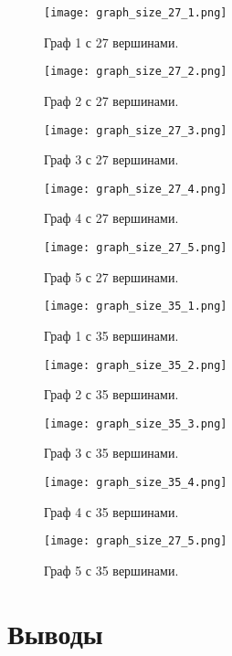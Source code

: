 \documentclass[12pt, a4paper]{report}
\begin{document}
	\begin{figure}[h]
		\centering
		\texttt{[image: graph\_size\_27\_1.png]}
		\caption{Граф 1 с 27 вершинами.}
	\end{figure}
	\begin{figure}[h]
		\centering
		\texttt{[image: graph\_size\_27\_2.png]}
		\caption{Граф 2 с 27 вершинами.}
	\end{figure}
	\begin{figure}[h]
		\centering
		\texttt{[image: graph\_size\_27\_3.png]}
		\caption{Граф 3 с 27 вершинами.}
	\end{figure}
	\begin{figure}[h]
		\centering
		\texttt{[image: graph\_size\_27\_4.png]}
		\caption{Граф 4 с 27 вершинами.}
	\end{figure}
	\begin{figure}[h]
		\centering
		\texttt{[image: graph\_size\_27\_5.png]}
		\caption{Граф 5 с 27 вершинами.}
	\end{figure} 

	\begin{figure}[h]
		\centering
		\texttt{[image: graph\_size\_35\_1.png]}
		\caption{Граф 1 с 35 вершинами.}
	\end{figure}
	\begin{figure}[h]
		\centering
		\texttt{[image: graph\_size\_35\_2.png]}
		\caption{Граф 2 с 35 вершинами.}
	\end{figure}
	\begin{figure}[h]
		\centering
		\texttt{[image: graph\_size\_35\_3.png]}
		\caption{Граф 3 с 35 вершинами.}
	\end{figure}
	\begin{figure}[h]
		\centering
		\texttt{[image: graph\_size\_35\_4.png]}
		\caption{Граф 4 с 35 вершинами.}
	\end{figure}
	\begin{figure}[h]
		\centering
		\texttt{[image: graph\_size\_27\_5.png]}
		\caption{Граф 5 с 35 вершинами.}
	\end{figure} 

	\vfill
	\clearpage

	\section*{Выводы}
\end{document}
